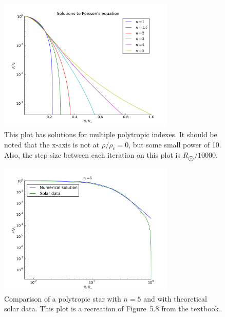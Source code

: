 \documentclass[11pt,letterpaper]{article}
\begin{document}
\begin{figure}
    \centering
    \includegraphics[width=0.75\textwidth]{figures/many_sols.pdf}
    \caption{This plot has solutions for multiple polytropic indexes. It should
    be noted that the x-axis is not at $\rho/\rho_c = 0$, but some small power
    of 10. Also, the step size between each iteration on this plot is
    $R_{\bigodot} / 10000$.}
    \label{many_sols}
\end{figure}

\begin{figure}
    \centering
    \includegraphics[width=0.75\textwidth]{figures/poly5_solar.pdf}
    \caption{Comparison of a polytropic star with $n=5$ and with theoretical
    solar data. This plot is a recreation of Figure~5.8 from the textbook.}
    \label{poly5data}
\end{figure}


{}
\end{document}
